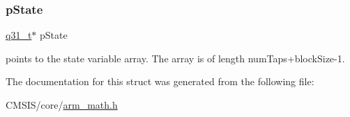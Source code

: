 \subsubsection{\texorpdfstring{pState}{pState}}
{\footnotesize\ttfamily \mbox{\hyperlink{arm__math_8h_adc89a3547f5324b7b3b95adec3806bc0}{q31\+\_\+t}}$\ast$ p\+State}

points to the state variable array. The array is of length num\+Taps+block\+Size-\/1. 

The documentation for this struct was generated from the following file\+:\begin{DoxyCompactItemize}
\item 
C\+M\+S\+I\+S/core/\mbox{\hyperlink{arm__math_8h}{arm\+\_\+math.\+h}}\end{DoxyCompactItemize}
